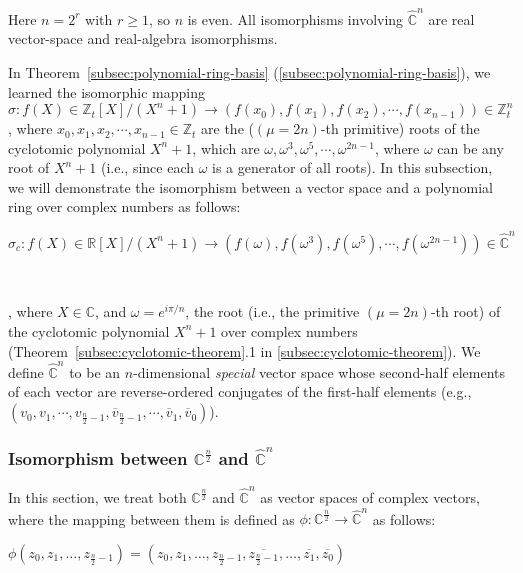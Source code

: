 Here $n=2^r$ with $r\ge1$, so $n$ is even. All isomorphisms involving $\hat{\mathbb C}^n$ are real vector-space and real-algebra isomorphisms.


In Theorem~\ref*{subsec:polynomial-ring-basis} (\autoref{subsec:polynomial-ring-basis}), we learned the isomorphic mapping
\[
\sigma: f(X) \in \mathbb{Z}_t[X]/(X^n + 1) \longrightarrow (f(x_0),f(x_1),f(x_2), \cdots, f(x_{n-1})) \in \mathbb{Z}_t^n
\]
, where $x_0, x_1, x_2, \cdots, x_{n-1} \in \mathbb{Z}_t$ are the ($(\mu=2n)$-th primitive) roots of the cyclotomic polynomial $X^n + 1$, which are $\omega, \omega^3, \omega^5, \cdots, \omega^{2n-1}$, where $\omega$ can be any root of $X^n + 1$ (i.e., since each $\omega$ is a generator of all roots). In this subsection, we will demonstrate the isomorphism between a vector space and a polynomial ring over complex numbers as follows:

$\sigma_c: f(X) \in \mathbb{R}[X]/(X^n + 1) \longrightarrow (f(\omega),f(\omega^3),f(\omega^5), \cdots, f(\omega^{2n-1})) \in \mathbb{\hat{C}}^{n}$

$ $

, where $X \in \mathbb{C}$, and $\omega = e^{i\pi/n}$, the root (i.e., the primitive $(\mu=2n)$-th root) of the cyclotomic polynomial $X^n + 1$ over complex numbers (Theorem~\ref*{subsec:cyclotomic-theorem}.1 in \autoref{subsec:cyclotomic-theorem}). We define $\mathbb{\hat{C}}^{n}$ to be an $n$-dimensional \textit{special} vector space whose second-half elements of each vector are reverse-ordered conjugates of the first-half elements (e.g., $(v_0, v_1, \cdots, v_{\frac{n}{2}-1}, \overline{v}_{\frac{n}{2}-1}, \cdots, \overline{v}_1, \overline{v}_0 )$). 

\subsubsection{Isomorphism between $\mathbb{C}^{\frac{n}{2}}$ and $\hat{\mathbb{C}}^{n}$}
\label{subsec:poly-vector-transformation-complex-isomorphism1}

In this section, we treat both $\mathbb{C}^{\frac{n}{2}}$ and $\hat{\mathbb{C}}^{n}$ as vector spaces of complex vectors, where the mapping between them is defined as $\phi: \mathbb{C}^{\frac{n}{2}} \rightarrow \hat{\mathbb{C}}^{n}$ as follows:

$\phi(z_0, z_1, \dots, z_{\frac{n}{2}-1}) = (z_0, z_1, \dots, z_{\frac{n}{2}-1}, \overline{z_{\frac{n}{2}-1}}, \dots, \overline{z_1}, \overline{z_0})$


$ $

